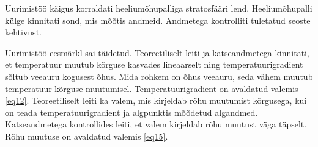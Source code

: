 \documentclass{trkut}%
\begin{document}
Uurimistöö käigus korraldati heeliumõhupalliga stratosfääri lend. Heeliumõhupalli külge kinnitati sond, mis mõõtis andmeid. Andmetega kontrolliti tuletatud seoste kehtivust.

Uurimistöö eesmärkl sai täidetud. Teoreetiliselt leiti ja katseandmetega kinnitati, et temperatuur muutub kõrguse kasvades lineaarselt ning temperatuurigradient sõltub veeauru kogusest õhus. Mida rohkem on õhus veeauru, seda vähem muutub temperatuur kõrguse muutumisel. Temperatuurigradient on avaldatud valemis \ref{eq12}. Teoreetiliselt leiti ka valem, mis kirjeldab rõhu muutumist kõrgusega, kui on teada temperatuurigradient ja algpunktis mõõdetud algandmed. Katseandmetega kontrollides leiti, et valem kirjeldab rõhu muutust väga täpselt. Rõhu muutuse on avaldatud valemis \ref{eq15}.






\printbibliography

\scriptsize

\normalsize

\scriptsize

\normalsize

\scriptsize

\normalsize

\scriptsize

\normalsize


\kinnitusleht%




\end{document}
